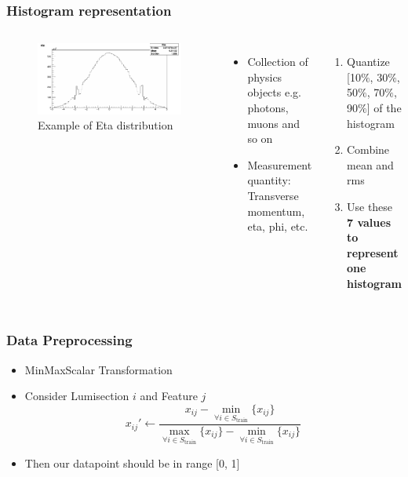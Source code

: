 \documentclass{beamer}
\begin{document}
\begin{frame}
\frametitle{Histogram representation}
\begin{columns}
    \begin{figure}
        \includegraphics[height=0.4\textheight, width=1.0\textwidth]{images/ex_eta_dist}
        \caption{Example of Eta distribution}
    \end{figure}
    \begin{itemize}
    \item Collection of physics objects e.g. photons, muons and so on
    \item Measurement quantity: Transverse momentum, eta, phi, etc.
    \end{itemize}
    \begin{enumerate}
        \item Quantize [10$\%$, 30$\%$, 50$\%$, 70$\%$, 90$\%$] of the histogram
        \item Combine mean and rms
        \item Use these \textbf{7 values to represent one histogram}
    \end{enumerate}
\end{columns}
\end{frame}
    
\begin{frame}
\frametitle{Data Preprocessing}
\begin{itemize}
    \item MinMaxScalar Transformation
    \item Consider Lumisection $i$ and Feature $j$
    \begin{equation}
        x_{ij}' \leftarrow \frac{x_{ij} - \min_{\forall i\in S_{\text{train}}}\{x_{ij}\}}{\max_{\forall i\in S_{\text{train}}}\{x_{ij}\} - \min_{\forall i\in S_{\text{train}}}\{x_{ij}\} }
    \end{equation}
    \item Then our datapoint should be in range [0, 1]
\end{itemize}
\end{frame}
\end{document}
